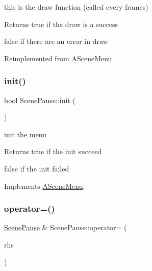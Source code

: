 this is the draw function (called every frames) 

\begin{DoxyReturn}{Returns}
true if the draw is a success 

false if there are an error in draw 
\end{DoxyReturn}


Reimplemented from \hyperlink{class_a_scene_menu_a5c11f34c83f025e1181219bf25ce4694}{A\+Scene\+Menu}.

\mbox{\label{class_scene_pause_ae5e00c5fcd82e97985d93f918b9e4b35}} 
\subsubsection{\texorpdfstring{init()}{init()}}
{\footnotesize\ttfamily bool Scene\+Pause\+::init (\begin{DoxyParamCaption}{ }\end{DoxyParamCaption})\hspace{0.3cm}{\ttfamily [virtual]}}



init the menu 

\begin{DoxyReturn}{Returns}
true if the init succeed 

false if the init failed 
\end{DoxyReturn}


Implements \hyperlink{class_a_scene_menu_a78bdee98bd7df224524586a060f9bdec}{A\+Scene\+Menu}.

\mbox{\label{class_scene_pause_a27c0ac4756961e331d996ba0d2ffe269}} 
\subsubsection{\texorpdfstring{operator=()}{operator=()}}
{\footnotesize\ttfamily \hyperlink{class_scene_pause}{Scene\+Pause} \& Scene\+Pause\+::operator= (\begin{DoxyParamCaption}\item[{\hyperlink{class_scene_pause}{Scene\+Pause} const \&}]{rhs }\end{DoxyParamCaption})}



